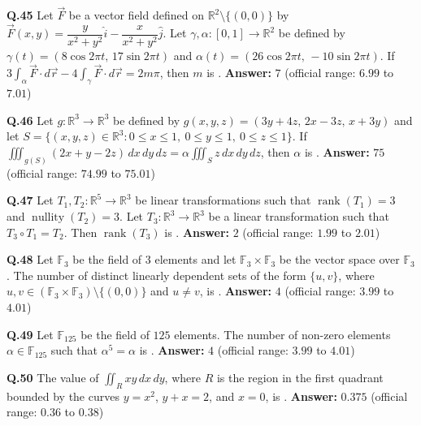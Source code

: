 \documentclass[11pt,a4paper]{article}
\newcommand{\ans}[1]{\textbf{Answer:} #1\par\medskip}
\begin{document}
\textbf{Q.45} Let $\vec{F}$ be a vector field defined on $\mathbb{R}^2 \setminus \{(0, 0)\}$ by $\vec{F}(x, y) = \dfrac{y}{x^2 + y^2}\hat{i} - \dfrac{x}{x^2 + y^2}\hat{j}$. Let $\gamma, \alpha : [0, 1] \to \mathbb{R}^2$ be defined by $\gamma(t) = (8\cos 2\pi t,\, 17\sin 2\pi t)$ and $\alpha(t) = (26\cos 2\pi t,\, -10\sin 2\pi t)$. If $3\displaystyle\int_\alpha \vec{F} \cdot d\vec{r} - 4\int_\gamma \vec{F} \cdot d\vec{r} = 2m\pi$, then $m$ is \underline{\hspace{2cm}}.
\ans{$7$ (official range: $6.99$ to $7.01$)}

\textbf{Q.46} Let $g : \mathbb{R}^3 \to \mathbb{R}^3$ be defined by $g(x, y, z) = (3y + 4z,\, 2x - 3z,\, x + 3y)$ and let $S = \{(x, y, z) \in \mathbb{R}^3 : 0 \le x \le 1,\ 0 \le y \le 1,\ 0 \le z \le 1\}$. If $\displaystyle\iiint_{g(S)} (2x + y - 2z)\,dx\,dy\,dz = \alpha \iiint_S z\,dx\,dy\,dz$, then $\alpha$ is \underline{\hspace{2cm}}.
\ans{$75$ (official range: $74.99$ to $75.01$)}

\textbf{Q.47} Let $T_1, T_2 : \mathbb{R}^5 \to \mathbb{R}^3$ be linear transformations such that $\operatorname{rank}(T_1) = 3$ and $\operatorname{nullity}(T_2) = 3$. Let $T_3 : \mathbb{R}^3 \to \mathbb{R}^3$ be a linear transformation such that $T_3 \circ T_1 = T_2$. Then $\operatorname{rank}(T_3)$ is \underline{\hspace{2cm}}.
\ans{$2$ (official range: $1.99$ to $2.01$)}

\textbf{Q.48} Let $\mathbb{F}_3$ be the field of $3$ elements and let $\mathbb{F}_3 \times \mathbb{F}_3$ be the vector space over $\mathbb{F}_3$. The number of distinct linearly dependent sets of the form $\{u, v\}$, where $u, v \in (\mathbb{F}_3 \times \mathbb{F}_3) \setminus \{(0, 0)\}$ and $u \ne v$, is \underline{\hspace{2cm}}.
\ans{$4$ (official range: $3.99$ to $4.01$)}

\textbf{Q.49} Let $\mathbb{F}_{125}$ be the field of $125$ elements. The number of non-zero elements $\alpha \in \mathbb{F}_{125}$ such that $\alpha^5 = \alpha$ is \underline{\hspace{2cm}}.
\ans{$4$ (official range: $3.99$ to $4.01$)}

\textbf{Q.50} The value of $\displaystyle\iint_R xy\,dx\,dy$, where $R$ is the region in the first quadrant bounded by the curves $y = x^2$, $y + x = 2$, and $x = 0$, is \underline{\hspace{2cm}}.
\ans{$0.375$ (official range: $0.36$ to $0.38$)}
\end{document}
